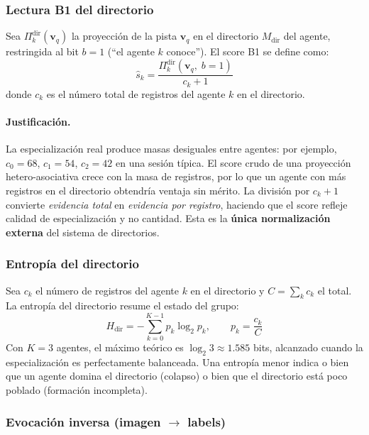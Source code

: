 \subsubsection*{Lectura B1 del directorio}

Sea $\Pi^{\mathrm{dir}}_k(\mathbf{v}_q)$ la proyección de la pista $\mathbf{v}_q$
en el directorio $M_{\mathrm{dir}}$ del agente, restringida al bit $b=1$
(``el agente $k$ conoce'').
El score B1 se define como:
\begin{equation}
    \hat{s}_k = \frac{\Pi^{\mathrm{dir}}_k(\mathbf{v}_q,\; b{=}1)}{c_k + 1}
    \label{eq:b1}
\end{equation}
donde $c_k$ es el número total de registros del agente $k$ en el directorio.

\paragraph{Justificación.}
La especialización real produce masas desiguales entre agentes: por ejemplo,
$c_0 = 68$, $c_1 = 54$, $c_2 = 42$ en una sesión típica.
El score crudo de una proyección hetero-asociativa crece con la masa de registros,
por lo que un agente con más registros en el directorio obtendría ventaja sin mérito.
La división por $c_k + 1$ convierte \emph{evidencia total} en \emph{evidencia por
registro}, haciendo que el score refleje calidad de especialización y no cantidad.
Esta es la \textbf{única normalización externa} del sistema de directorios.

\subsubsection*{Entropía del directorio}

Sea $c_k$ el número de registros del agente $k$ en el directorio y
$C = \sum_k c_k$ el total.
La entropía del directorio resume el estado del grupo:
\begin{equation}
    H_{\mathrm{dir}} = -\sum_{k=0}^{K-1} p_k \log_2 p_k, \qquad p_k = \frac{c_k}{C}
    \label{eq:entropia-dir}
\end{equation}
Con $K=3$ agentes, el máximo teórico es $\log_2 3 \approx 1{.}585$ bits,
alcanzado cuando la especialización es perfectamente balanceada.
Una entropía menor indica o bien que un agente domina el directorio (colapso) o bien
que el directorio está poco poblado (formación incompleta).

\subsubsection*{Evocación inversa (imagen $\to$ labels)}

